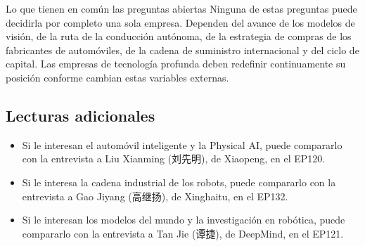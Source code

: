 \documentclass[a4paper]{article}
\begin{document}
\begin{warningbox}{Lo que tienen en común las preguntas abiertas}
Ninguna de estas preguntas puede decidirla por completo una sola empresa. Dependen del avance de los modelos de visión, de la ruta de la conducción autónoma, de la estrategia de compras de los fabricantes de automóviles, de la cadena de suministro internacional y del ciclo de capital. Las empresas de tecnología profunda deben redefinir continuamente su posición conforme cambian estas variables externas.
\end{warningbox}

\subsection{Lecturas adicionales}

\begin{itemize}
\item Si le interesan el automóvil inteligente y la Physical AI, puede compararlo con la entrevista a Liu Xianming (刘先明), de Xiaopeng, en el EP120.
\item Si le interesa la cadena industrial de los robots, puede compararlo con la entrevista a Gao Jiyang (高继扬), de Xinghaitu, en el EP132.
\item Si le interesan los modelos del mundo y la investigación en robótica, puede compararlo con la entrevista a Tan Jie (谭捷), de DeepMind, en el EP121.
\end{itemize}
\end{document}
